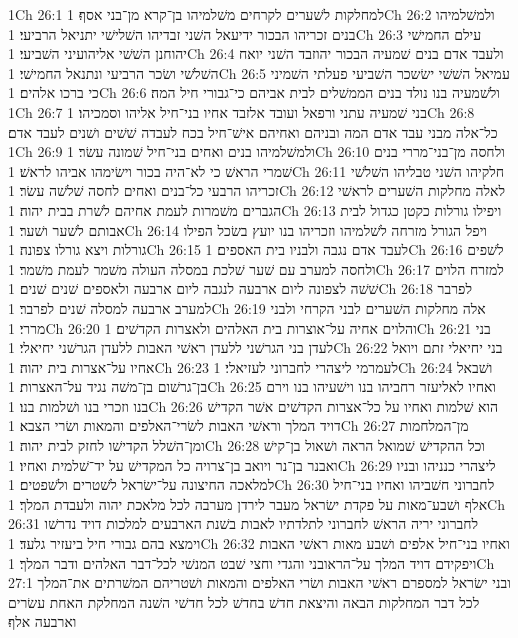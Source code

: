 1Ch 26:1  למחלקות לשׁערים לקרחים משׁלמיהו בן־קרא מן־בני אסף׃
1Ch 26:2  ולמשׁלמיהו בנים זכריהו הבכור ידיעאל השׁני זבדיהו השׁלישׁי יתניאל הרביעי׃
1Ch 26:3  עילם החמישׁי יהוחנן השׁשׁי אליהועיני השׁביעי׃
1Ch 26:4  ולעבד אדם בנים שׁמעיה הבכור יהוזבד השׁני יואח השׁלשׁי ושׂכר הרביעי ונתנאל החמישׁי׃
1Ch 26:5  עמיאל השׁשׁי ישׂשכר השׁביעי פעלתי השׁמיני כי ברכו אלהים׃
1Ch 26:6  ולשׁמעיה בנו נולד בנים הממשׁלים לבית אביהם כי־גבורי חיל המה׃
1Ch 26:7  בני שׁמעיה עתני ורפאל ועובד אלזבד אחיו בני־חיל אליהו וסמכיהו׃
1Ch 26:8  כל־אלה מבני עבד אדם המה ובניהם ואחיהם אישׁ־חיל בכח לעבדה שׁשׁים ושׁנים לעבד אדם׃
1Ch 26:9  ולמשׁלמיהו בנים ואחים בני־חיל שׁמונה עשׂר׃
1Ch 26:10  ולחסה מן־בני־מררי בנים שׁמרי הראשׁ כי לא־היה בכור וישׂימהו אביהו לראשׁ׃
1Ch 26:11  חלקיהו השׁני טבליהו השׁלשׁי זכריהו הרבעי כל־בנים ואחים לחסה שׁלשׁה עשׂר׃
1Ch 26:12  לאלה מחלקות השׁערים לראשׁי הגברים משׁמרות לעמת אחיהם לשׁרת בבית יהוה׃
1Ch 26:13  ויפילו גורלות כקטן כגדול לבית אבותם לשׁער ושׁער׃
1Ch 26:14  ויפל הגורל מזרחה לשׁלמיהו וזכריהו בנו יועץ בשׂכל הפילו גורלות ויצא גורלו צפונה׃
1Ch 26:15  לעבד אדם נגבה ולבניו בית האספים׃
1Ch 26:16  לשׁפים ולחסה למערב עם שׁער שׁלכת במסלה העולה משׁמר לעמת משׁמר׃
1Ch 26:17  למזרח הלוים שׁשׁה לצפונה ליום ארבעה לנגבה ליום ארבעה ולאספים שׁנים שׁנים׃
1Ch 26:18  לפרבר למערב ארבעה למסלה שׁנים לפרבר׃
1Ch 26:19  אלה מחלקות השׁערים לבני הקרחי ולבני מררי׃
1Ch 26:20  והלוים אחיה על־אוצרות בית האלהים ולאצרות הקדשׁים׃
1Ch 26:21  בני לעדן בני הגרשׁני ללעדן ראשׁי האבות ללעדן הגרשׁני יחיאלי׃
1Ch 26:22  בני יחיאלי זתם ויואל אחיו על־אצרות בית יהוה׃
1Ch 26:23  לעמרמי ליצהרי לחברוני לעזיאלי׃
1Ch 26:24  ושׁבאל בן־גרשׁום בן־משׁה נגיד על־האצרות׃
1Ch 26:25  ואחיו לאליעזר רחביהו בנו וישׁעיהו בנו וירם בנו וזכרי בנו ושׁלמות בנו׃
1Ch 26:26  הוא שׁלמות ואחיו על כל־אצרות הקדשׁים אשׁר הקדישׁ דויד המלך וראשׁי האבות לשׂרי־האלפים והמאות ושׂרי הצבא׃
1Ch 26:27  מן־המלחמות ומן־השׁלל הקדישׁו לחזק לבית יהוה׃
1Ch 26:28  וכל ההקדישׁ שׁמואל הראה ושׁאול בן־קישׁ ואבנר בן־נר ויואב בן־צרויה כל המקדישׁ על יד־שׁלמית ואחיו׃
1Ch 26:29  ליצהרי כנניהו ובניו למלאכה החיצונה על־ישׂראל לשׁטרים ולשׁפטים׃
1Ch 26:30  לחברוני חשׁביהו ואחיו בני־חיל אלף ושׁבע־מאות על פקדת ישׂראל מעבר לירדן מערבה לכל מלאכת יהוה ולעבדת המלך׃
1Ch 26:31  לחברוני יריה הראשׁ לחברוני לתלדתיו לאבות בשׁנת הארבעים למלכות דויד נדרשׁו וימצא בהם גבורי חיל ביעזיר גלעד׃
1Ch 26:32  ואחיו בני־חיל אלפים ושׁבע מאות ראשׁי האבות ויפקידם דויד המלך על־הראובני והגדי וחצי שׁבט המנשׁי לכל־דבר האלהים ודבר המלך׃
1Ch 27:1  ובני ישׂראל למספרם ראשׁי האבות ושׂרי האלפים והמאות ושׁטריהם המשׁרתים את־המלך לכל דבר המחלקות הבאה והיצאת חדשׁ בחדשׁ לכל חדשׁי השׁנה המחלקת האחת עשׂרים וארבעה אלף׃
